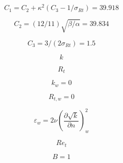 \begin{equation}
C_1 = C_2 + \kappa^2(C_3 - 1/\sigma_{Rt}) = 39.918
\end{equation}

\begin{equation}
C_2 = (12/11) \sqrt{\beta/\alpha} = 39.834
\end{equation}

\begin{equation}
C_3 = 3/(2 \sigma_{Rt}) = 1.5
\end{equation}

\begin{equation}
k
\end{equation}

\begin{equation}
R_t
\end{equation}

\begin{equation}
k_w = 0
\end{equation}

\begin{equation}
R_{t,w} = 0
\end{equation}

\begin{equation}
\varepsilon_w = 2 \nu \left(\frac{\partial \sqrt{k}}{\partial n} \right)_w^2
\end{equation}

\begin{equation}
Re_t
\end{equation}

\begin{equation}
B=1
\end{equation}


